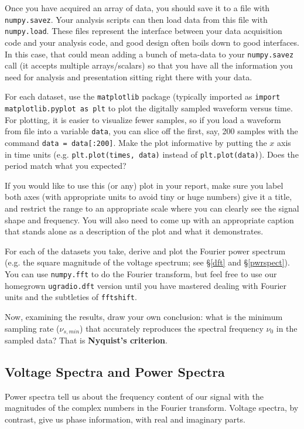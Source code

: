 \documentclass[11pt,preprint]{aastex}
\begin{document}
Once you have acquired an array of data, you should save it to a file
with {\tt numpy.savez}.  Your analysis scripts can then 
load data from this file with {\tt numpy.load}. These files represent the interface
between your data acquisition code and your analysis code, and good design often
boils down to good interfaces. In this case, that could mean adding a bunch of meta-data
to your {\tt numpy.savez} call (it accepts multiple arrays/scalars) so that you have
all the information you need for analysis and presentation sitting right there with your data.

For each dataset, use the {\tt matplotlib} package (typically imported
as {\tt import matplotlib.pyplot as plt} to plot
the digitally sampled waveform versus
time.  
For plotting, it is easier to visualize fewer samples, so if you load a waveform from file into
a variable {\tt data}, you can slice off the first, say, 200 samples with the command {\tt data = data[:200]}.
Make the plot informative by putting the $x$ axis in time units (e.g. {\tt plt.plot(times, data)} instead of {\tt plt.plot(data)}). 
Does the period match what you expected?

If you would like to use this (or any) plot in your report, make sure you label both axes (with
appropriate units to avoid tiny or huge numbers)
give it a title, and restrict the range to an appropriate scale where you can clearly see
the signal shape and frequency. You will also need to come up with an appropriate caption that
stands alone as a description of the plot and what it demonstrates.

For each of the datasets you take, derive and plot the Fourier power spectrum
(e.g. the square magnitude of the voltage spectrum; see \S\ref{dft} and \S\ref{pwrspect}). You can use {\tt numpy.fft} to do the Fourier
transform, 
but feel free to use our homegrown {\tt ugradio.dft} version until you have mastered dealing with
Fourier units and the subtleties of {\tt fftshift}.

Now, examining the results, draw your own conclusion: what is the
minimum sampling rate ($\nu_{s,min}$) that accurately reproduces the spectral frequency $\nu_0$ in
the sampled data?  That is {\bf Nyquist's criterion}. 

\subsection{Voltage Spectra and Power Spectra}

\noindent
Power spectra tell us about the frequency content of our signal with
the magnitudes of the complex numbers in the Fourier transform.  Voltage
spectra, by contrast, give us phase information,
with real and imaginary parts.
\end{document}
